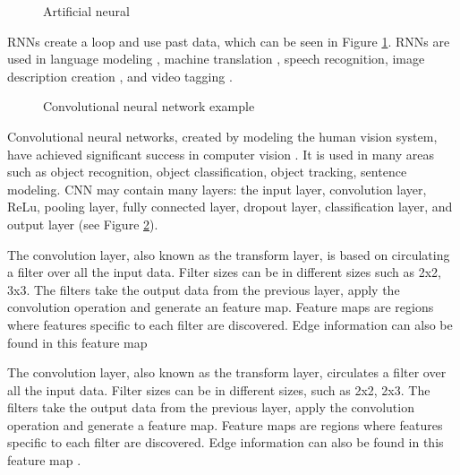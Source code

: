 \begin{figure}[htbp]
\centering
{}
\caption{Artificial neural \cite{quiza2009computational}}
\label{fig:MethodologyRecurrentNeuralNetwork}
\end{figure}

RNNs create a loop and use past data, which can be seen in Figure \ref{fig:MethodologyRecurrentNeuralNetwork}. RNNs are used in language modeling \cite{mikolov2011extensions}, machine translation \cite{cho2014learning}, speech recognition\cite{miao2015eesen}, image description creation \cite{mao2014deep}, and video tagging \cite{garg2021video}. 

\begin{figure}[htbp]
\centering
{}
\caption{Convolutional neural network example \cite{ferracuti2019business}}
\label{fig:MethodologyConvolutionalNeuralNetworkExample}
\end{figure}

Convolutional neural networks, created by modeling the human vision system, have achieved significant success in computer vision \cite{gu2018recent, bouvrie2006notes, lavin2016fast}. It is used in many areas such as object recognition, object classification, object tracking, sentence modeling. CNN may contain many layers: the input layer, convolution layer, ReLu, pooling layer, fully connected layer, dropout layer, classification layer, and output layer (see Figure \ref{fig:MethodologyConvolutionalNeuralNetworkExample}).

The convolution layer, also known as the transform layer, is based on circulating a filter over all the input data. Filter sizes can be in different sizes such as 2x2, 3x3. The filters take the output data from the previous layer, apply the convolution operation and generate an feature map. Feature maps are regions where features specific to each filter are discovered. Edge information can also be found in this feature map \cite{goodfellow2016deep}

The convolution layer, also known as the transform layer, circulates a filter over all the input data. Filter sizes can be in different sizes, such as 2x2, 2x3. The filters take the output data from the previous layer, apply the convolution operation and generate a feature map. Feature maps are regions where features specific to each filter are discovered. Edge information can also be found in this feature map \cite{goodfellow2016deep}.

